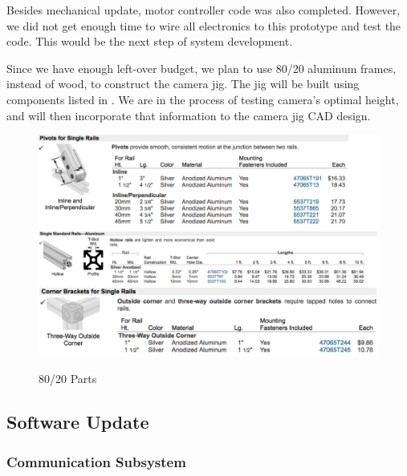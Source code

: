 Besides mechanical update, motor controller code was also completed. However, we did not get enough time to wire all electronics to this prototype and test the code. This would be the next step of system development. 

Since we have enough left-over budget, we plan to use 80/20 aluminum frames, instead of wood, to construct the camera jig. The jig will be built using components listed in . We are in the process of testing camera’s optimal height, and will then incorporate that information to the camera jig CAD design. 

\begin{figure}[h!]
\centering
\includegraphics[width=0.98\columnwidth]{CAD/8020.jpeg}
\label{fig:em4}
\caption{80/20 Parts}
\end{figure}

\subsection{Software Update}
\label{sec:software_progress}

\subsubsection{Communication Subsystem}
\label{sec:progress_comm_sys}


